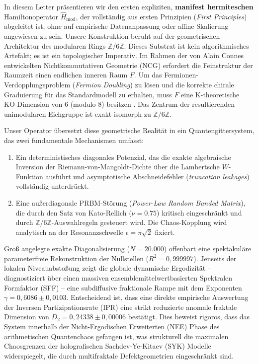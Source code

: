 \documentclass[aps,prl,preprint,superscriptaddress,floatfix]{revtex4-2}
\newcommand{\Zmod}{\mathbb{Z}/6\mathbb{Z}}
\begin{document}
In diesem Letter präsentieren wir den ersten expliziten, \textbf{manifest hermiteschen} Hamiltonoperator $\hat{H}_{\text{mod}}$, der vollständig aus ersten Prinzipien (\textit{First Principles}) abgeleitet ist, ohne auf empirische Datenanpassung oder affine Skalierung angewiesen zu sein. Unsere Konstruktion beruht auf der geometrischen Architektur des modularen Rings $\mathbb{Z}/6\mathbb{Z}$. Dieses Substrat ist kein algorithmisches Artefakt; es ist ein topologischer Imperativ. Im Rahmen der von Alain Connes entwickelten Nichtkommutativen Geometrie (NCG) erfordert die Feinstruktur der Raumzeit einen endlichen inneren Raum $F$. Um das Fermionen-Verdopplungsproblem (\textit{Fermion Doubling}) zu lösen und die korrekte chirale Graduierung für das Standardmodell zu erhalten, muss $F$ eine K-theoretische KO-Dimension von 6 (modulo 8) besitzen \cite{Connes2008, Chamseddine2007, ConnesConsani2021}. Das Zentrum der resultierenden unimodularen Eichgruppe ist exakt isomorph zu $\Zmod$.

Unser Operator übersetzt diese geometrische Realität in ein Quantengittersystem, das zwei fundamentale Mechanismen umfasst:
\begin{enumerate}
    \item Ein deterministisches diagonales Potenzial, das die exakte algebraische Inversion der Riemann-von-Mangoldt-Dichte über die Lambertsche $W$-Funktion ausführt und asymptotische Abschneidefehler (\textit{truncation leakages}) vollständig unterdrückt.
    \item Eine außerdiagonale PRBM-Störung (\textit{Power-Law Random Banded Matrix}), die durch den Satz von Kato-Rellich ($\nu = 0.75$) kritisch eingeschränkt und durch $\Zmod$-Auswahlregeln gesteuert wird. Die Chaos-Kopplung wird analytisch an der Resonanzschwelle $\epsilon = \pi\sqrt{2}$ fixiert.
\end{enumerate}

Groß angelegte exakte Diagonalisierung ($N=20.000$) offenbart eine spektakuläre parameterfreie Rekonstruktion der Nullstellen ($R^2 = 0,999997$). Jenseits der lokalen Niveauabstoßung zeigt die globale dynamische Ergodizität – diagnostiziert über einen massiven ensemblemittelwertbasierten Spektralen Formfaktor (SFF) – eine subdiffusive fraktionale Rampe mit dem Exponenten $\gamma = 0,6086 \pm 0,0103$. Entscheidend ist, dass eine direkte empirische Auswertung der Inversen Partizipationsrate (IPR) eine strikt reduzierte anomale fraktale Dimension von $D_2 = 0,24338 \pm 0,00006$ bestätigt. Dies beweist rigoros, dass das System innerhalb der Nicht-Ergodischen Erweiterten (NEE) Phase des arithmetischen Quantenchaos gefangen ist, was strukturell die maximalen Chaosgrenzen der holografischen Sachdev-Ye-Kitaev (SYK) Modelle widerspiegelt, die durch multifraktale Defektgeometrien eingeschränkt sind.
\end{document}
